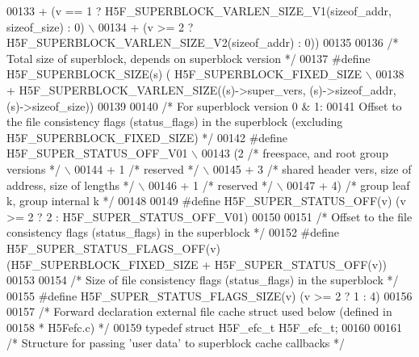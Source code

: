 \begin{DoxyCode}
00133 \textcolor{preprocessor}{        + (v == 1 ? H5F\_SUPERBLOCK\_VARLEN\_SIZE\_V1(sizeof\_addr, sizeof\_size) : 0) \(\backslash\)}
00134 \textcolor{preprocessor}{        + (v >= 2 ? H5F\_SUPERBLOCK\_VARLEN\_SIZE\_V2(sizeof\_addr) : 0))}
00135 
00136 \textcolor{comment}{/* Total size of superblock, depends on superblock version */}
00137 \textcolor{preprocessor}{#define H5F\_SUPERBLOCK\_SIZE(s) ( H5F\_SUPERBLOCK\_FIXED\_SIZE              \(\backslash\)}
00138 \textcolor{preprocessor}{        + H5F\_SUPERBLOCK\_VARLEN\_SIZE((s)->super\_vers, (s)->sizeof\_addr, (s)->sizeof\_size))}
00139 
00140 \textcolor{comment}{/* For superblock version 0 & 1:}
00141 \textcolor{comment}{   Offset to the file consistency flags (status\_flags) in the superblock (excluding
       H5F\_SUPERBLOCK\_FIXED\_SIZE) */}
00142 \textcolor{preprocessor}{#define H5F\_SUPER\_STATUS\_OFF\_V01                                                \(\backslash\)}
00143 \textcolor{preprocessor}{        (2  }\textcolor{comment}{/* freespace, and root group versions */}\textcolor{preprocessor}{                    \(\backslash\)}
00144 \textcolor{preprocessor}{        + 1 }\textcolor{comment}{/* reserved */}\textcolor{preprocessor}{                                              \(\backslash\)}
00145 \textcolor{preprocessor}{        + 3 }\textcolor{comment}{/* shared header vers, size of address, size of lengths */}\textcolor{preprocessor}{  \(\backslash\)}
00146 \textcolor{preprocessor}{        + 1 }\textcolor{comment}{/* reserved */}\textcolor{preprocessor}{                                              \(\backslash\)}
00147 \textcolor{preprocessor}{        + 4) }\textcolor{comment}{/* group leaf k, group internal k */}\textcolor{preprocessor}{}
00148 
00149 \textcolor{preprocessor}{#define H5F\_SUPER\_STATUS\_OFF(v)   (v >= 2 ? 2 : H5F\_SUPER\_STATUS\_OFF\_V01)}
00150 
00151 \textcolor{comment}{/* Offset to the file consistency flags (status\_flags) in the superblock */}
00152 \textcolor{preprocessor}{#define H5F\_SUPER\_STATUS\_FLAGS\_OFF(v) (H5F\_SUPERBLOCK\_FIXED\_SIZE + H5F\_SUPER\_STATUS\_OFF(v))}
00153 
00154 \textcolor{comment}{/* Size of file consistency flags (status\_flags) in the superblock */}
00155 \textcolor{preprocessor}{#define H5F\_SUPER\_STATUS\_FLAGS\_SIZE(v)        (v >= 2 ? 1 : 4)}
00156 
00157 \textcolor{comment}{/* Forward declaration external file cache struct used below (defined in}
00158 \textcolor{comment}{ * H5Fefc.c) */}
00159 \textcolor{keyword}{typedef} \textcolor{keyword}{struct }H5F\_efc\_t H5F\_efc\_t;
00160 
00161 \textcolor{comment}{/* Structure for passing 'user data' to superblock cache callbacks */}

\end{DoxyCode}
